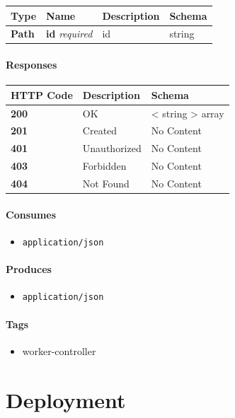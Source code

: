 \begin{longtable}[]{@{}llll@{}}
\toprule
Type & Name & Description & Schema\tabularnewline
\midrule
\endhead
\textbf{Path} & \textbf{id} \emph{required} & id & string\tabularnewline
\bottomrule
\end{longtable}

\subsubsection{Responses}\label{responses-24}

\begin{longtable}[]{@{}lll@{}}
\toprule
HTTP Code & Description & Schema\tabularnewline
\midrule
\endhead
\textbf{200} & OK & \textless{} string \textgreater{}
array\tabularnewline
\textbf{201} & Created & No Content\tabularnewline
\textbf{401} & Unauthorized & No Content\tabularnewline
\textbf{403} & Forbidden & No Content\tabularnewline
\textbf{404} & Not Found & No Content\tabularnewline
\bottomrule
\end{longtable}

\subsubsection{Consumes}\label{consumes-10}

\begin{itemize}
\tightlist
\item
  \texttt{application/json}
\end{itemize}

\subsubsection{Produces}\label{produces-24}

\begin{itemize}
\tightlist
\item
  \texttt{application/json}
\end{itemize}

\subsubsection{Tags}\label{tags-24}

\begin{itemize}
\tightlist
\item
  worker-controller
\end{itemize}

\chapter{Deployment}\label{deployment}

